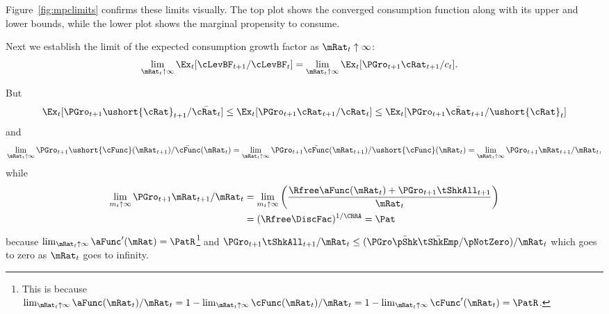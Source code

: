 \documentclass[./BufferStockTheory.tex]{subfiles}
\begin{document}
Figure~\ref{fig:mpclimits} confirms these limits visually.  The top
plot shows the converged consumption function along with its upper and lower bounds,
while the lower plot shows the marginal propensity to consume.
\renewcommand{\figFile}{mpclimits}
\hypertarget{\figFile}{}


\renewcommand{\figFile}{cFuncBounds}
\hypertarget{\figFile}{}



Next we establish the limit of the expected consumption growth factor
as $\mRat_{t} \uparrow \infty$:
\begin{equation}\begin{gathered}\begin{aligned}
\lim_{\mRat_{t} \uparrow \infty} \Ex_{t}[
\cLevBF_{t+1}/\cLevBF_{t}]  & = \lim_{\mRat_{t} \uparrow \infty} \Ex_{t}[
{\PGro}_{t+1} {\cRat}_{t+1}/c_{t}]. \notag
\end{aligned}\end{gathered}\end{equation}

But
\begin{align*}
\Ex_{t}[{\PGro}_{t+1} {\ushort{\cRat}}_{t+1}/\bar{\cRat_{t}}] \leq \Ex_{t}[{\PGro}_{t+1} {\cRat}_{t+1}/\cRat_{t}] \leq \Ex_{t}[{\PGro}_{t+1} {\bar{\cRat}}_{t+1}/\ushort{\cRat}_{t}]
\end{align*}
and
\begin{equation}  \label{eq:xttoinfty}
\lim_{\mRat_t \uparrow \infty} \PGro_{t+1}\ushort{\cFunc}(\mRat_{t+1})/\bar{\cFunc}(\mRat_t) =
\lim_{\mRat_{t} \uparrow \infty} \PGro_{t+1}\bar{\cFunc}(\mRat_{t+1})/\ushort{\cFunc}(\mRat_t) =
\lim_{\mRat_{t} \uparrow \infty}\PGro_{t+1} \mRat_{t+1}/\mRat_t,  \notag
\end{equation}
while \hypertarget{xtp1toinfty}{}
\begin{equation}\begin{gathered}\begin{aligned}  \label{eq:xtp1toinfty}
\lim_{m_{t} \uparrow \infty} \PGro_{t+1} \mRat_{t+1}/\mRat_t  & = \lim_{m_{t} \uparrow \infty}
\left(\frac{\Rfree \aFunc(\mRat_t)+{\PGro}_{t+1}\tShkAll_{t+1}}{\mRat_t}\right)
\\  & = (\Rfree \DiscFac)^{1/\CRRA} = \Pat
\end{aligned}\end{gathered}\end{equation}
because $\lim_{\mRat_{t}\uparrow \infty} \aFunc^{\prime}(\mRat)=\PatR$\footnote{This is because $\lim_{\mRat_{t}\uparrow \infty} \aFunc(\mRat_{t})/\mRat_{t}=1-\lim_{\mRat_{t}\uparrow \infty} \cFunc(\mRat_{t})/\mRat_{t}=1-\lim_{\mRat_{t}\uparrow \infty}\cFunc^{\prime}(\mRat_{t})=\PatR$.} and
$\PGro_{t+1}\tShkAll_{t+1}/\mRat_{t} \leq (\PGro \bar{\pShk} \bar{\tShkEmp}/\pNotZero )/\mRat_{t}$ which
goes to zero as $\mRat_{t}$ goes to infinity.
\end{document}
